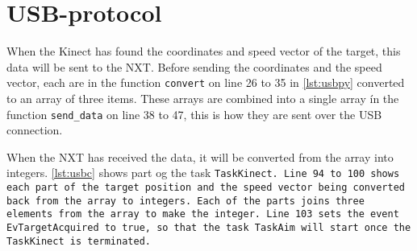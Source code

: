 \section{USB-protocol}
When the Kinect has found the coordinates and speed vector of the target, this data will be sent to the NXT. Before sending the coordinates and the speed vector, each are in the function \texttt{convert} on line 26 to 35 in \autoref{lst:usbpy} converted to an array of three items. These arrays are combined into a single array ín the function \texttt{send_data} on line 38 to 47, this is how they are sent over the USB connection.



When the NXT has received the data, it will be converted from the array into integers. \autoref{lst:usbc} shows part og the task \tt{TaskKinect}. Line 94 to 100 shows each part of the target position and the speed vector being converted back from the array to integers. Each of the parts joins three elements from the array to make the integer. 
Line 103 sets the event \texttt{EvTargetAcquired} to true, so that the task \texttt{TaskAim} will start once the \texttt{TaskKinect} is terminated.


